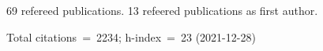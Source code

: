69 refereed publications. 13 refeered publications as first author.

Total citations~=~2234; h-index~=~23 (2021-12-28)